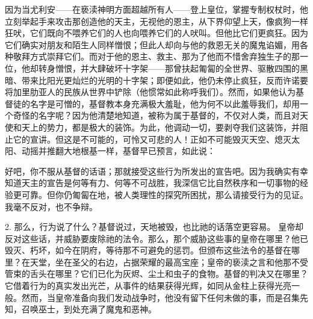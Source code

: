 因为当尤利安——在亵渎神明方面超越所有人——登上皇位，掌握专制权杖时，他立刻举起手来攻击那创造他的天主，无视他的恩主，从下界仰望上天，像疯狗一样狂吠，它们既向不喂养它们的人也向喂养它们的人吠叫。但他比它们更疯狂。因为它们确实对朋友和陌生人同样憎恨；但此人却向与他的救恩无关的魔鬼谄媚，用各种敬拜方式崇拜它们。而对于他的恩主、救主、那为了他而不惜舍弃独生子的那一位，他却转身憎恨，并大肆破坏十字架——那曾扶起匍匐的全世界、驱散四围的黑暗、带来比阳光更灿烂的光明的十字架；即便如此，他仍未停止疯狂，反而许诺要将加里肋亚人的民族从世界中铲除（他惯常如此称呼我们）。然而，如果他认为基督徒的名字是可憎的，基督教本身充满极大羞耻，他为何不以此羞辱我们，却用一个奇怪的名字呢？因为他清楚地知道，被称为属于基督的，不仅对人类，而且对天使和天上的势力，都是极大的装饰。为此，他调动一切，要剥夺我们这装饰，并阻止它的宣讲。但这是不可能的，可怜又可悲的人！正如不可能毁灭天空、熄灭太阳、动摇并推翻大地根基一样，基督早已预言，如此说：\par

好吧，你不服从基督的话语；那就接受这些行为所发出的宣告吧。因为我确实有幸知道天主的宣告是何等有力、何等不可战胜，我深信它比自然秩序和一切事物的经验更可靠。但你仍匍匐在地，被人类理性的探究所困扰，那么请接受行为的见证。我毫不反对，也不争辩。\par

2. 那么，行为说了什么？基督说过，天地被毁，也比祂的话落空更容易。 皇帝却反对这些话，并威胁要废除祂的法令。那么，那个威胁这些事的皇帝在哪里？他已毁灭、朽坏，如今在阴府，等待那不可避免的惩罚。但颁布这些法令的基督在哪里？在天堂，坐在圣父的右边，占据荣耀的最高宝座；皇帝的亵渎之言和他那不受管束的舌头在哪里？它们已化为灰烬、尘土和虫子的食物。基督的判决又在哪里？它借着行为的真实发出光芒，从事件的结果获得光辉，如同从金柱上获得光亮一般。然而，当皇帝准备向我们发动战争时，他没有留下任何未做的事，而是召集先知，召唤巫士，到处充满了魔鬼和恶神。\par

